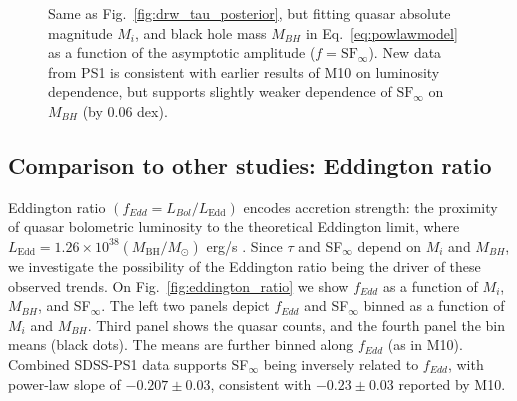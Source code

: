 \documentclass[twocolumn]{aastex62}
\begin{document}
\begin{figure*}
\caption{Same as Fig.~\ref{fig:drw_tau_posterior},  but fitting quasar absolute magnitude $M_{i}$, and black hole mass $M_{BH}$ in Eq.~\ref{eq:powlawmodel} as a function of the asymptotic amplitude ($f = \mathrm{SF}_{\infty}$). New data from PS1 is consistent with earlier results of M10 on luminosity dependence, but supports slightly weaker dependence of $\mathrm{SF}_{\infty}$ on $M_{BH}$ (by 0.06 dex).}
\label{fig:drw_sf_posterior}
\end{figure*} 

 

\subsection{Comparison to other studies: Eddington ratio}

Eddington ratio $(f_{Edd} {=} L_{Bol}/L_{\mathrm{Edd}})$ encodes accretion strength: the proximity of quasar bolometric luminosity to the theoretical Eddington limit, where $L_{\mathrm{Edd}} {=} 1.26 {\times} 10^{38} (M_{\mathrm{BH}} / M_{\odot})$ erg/s \citep{shen2011}. Since $\tau$ and SF$_{\infty}$ depend on $M_{i}$ and $M_{BH}$, we investigate the possibility of the Eddington ratio being the driver of these observed trends. On Fig.~\ref{fig:eddington_ratio} we show $f_{Edd} $ as a function of $M_{i}$, $M_{BH}$, and SF$_{\infty}$. The left two panels depict  $f_{Edd} $ and SF$_{\infty}$ binned as a function of $M_{i}$ and $M_{BH}$. Third panel shows the quasar counts, and the fourth panel the bin means (black dots). The means are further binned along  $f_{Edd} $ (as in M10). Combined SDSS-PS1 data supports SF$_{\infty}$  being inversely related to  $f_{Edd} $, with power-law slope of $-0.207 \pm 0.03$, consistent with  $-0.23 \pm 0.03$ reported by M10. 
\end{document}
